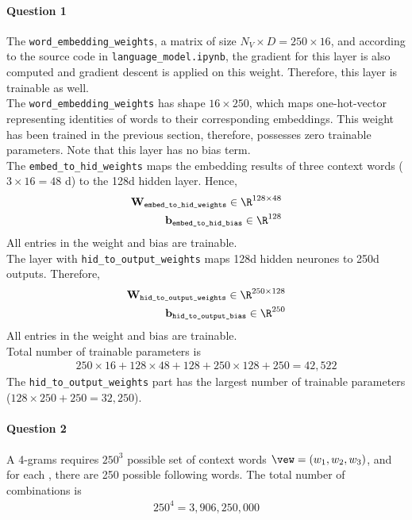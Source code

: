 \documentclass{article}
\begin{document}
    \paragraph{Question 1} The \texttt{word\_embedding\_weights}, a matrix of size $N_V \times D = 250 \times 16$, and according to the source code in \texttt{language\_model.ipynb}, the gradient for this layer is also computed and gradient descent is applied on this weight. Therefore, this layer is trainable as well. \\
    The \texttt{word\_embedding\_weights} has shape $16 \times 250$, which maps one-hot-vector representing identities of words to their corresponding embeddings. This weight has been trained in the previous section, therefore, possesses zero trainable parameters. Note that this layer has no bias term.\\
    The \texttt{embed\_to\_hid\_weights} maps the embedding results of three context words ($3 \times 16 = 48$ d) to the 128d hidden layer. Hence,
    \begin{align}
    	\textbf{W}_\texttt{embed\_to\_hid\_weights} \in \R^{128 \times 48} \\
    	\textbf{b}_\texttt{embed\_to\_hid\_bias} \in \R^{128}
    \end{align}
    All entries in the weight and bias are trainable. \\
    The layer with \texttt{hid\_to\_output\_weights} maps 128d hidden neurones to 250d outputs. Therefore,
    \begin{align}
    	\textbf{W}_\texttt{hid\_to\_output\_weights} \in \R^{250 \times 128} \\
    	\textbf{b}_\texttt{hid\_to\_output\_bias} \in \R^{250}
    \end{align}
    All entries in the weight and bias are trainable. \\
    Total number of trainable parameters is
    \begin{align}
    	250 \times 16 + 128 \times 48 + 128 + 250 \times 128 + 250 = 42,522
    \end{align}
    The \texttt{hid\_to\_output\_weights} part has the largest number of trainable parameters ($128 \times 250 + 250 = 32,250$).
    
    \paragraph{Question 2} A 4-grams requires $250^3$ possible set of context words $\vew = (w_1, w_2, w_3)$, and for each \vew, there are 250 possible following words. The total number of combinations is 
    \begin{align}
    	250^4 = 3,906,250,000
    \end{align}
    
\end{document}
